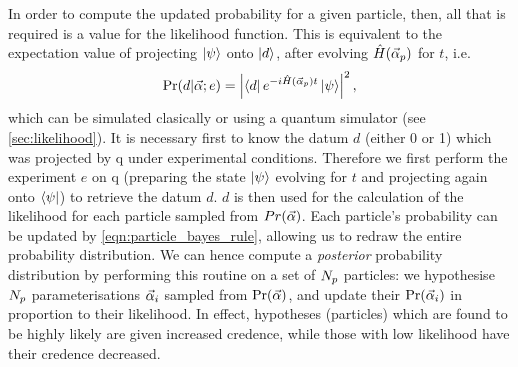 In order to compute the updated probability for a given particle, then, all that is required is a value for the \gls{likelihood} function.
This is equivalent to the expectation value of projecting $\ket{\psi}$ onto $\ket{d}$, after evolving $\hat{H}(\vec{\alpha}_p)$ for $t$, i.e. 
\begin{equation}
    \label{eqn:likelihood}
    \Pr(d | \vec{\alpha}; e) = \left| \bra{d} e^{-i \hat{H}(\vec{\alpha}_p)t} \ket{\psi} \right|^2,   
\end{equation}
    which can be simulated clasically or using a quantum simulator (see \cref{sec:likelihood}). 
It is necessary first to know the datum $d$ (either 0 or 1) which was projected by \gls{q} under experimental conditions. 
Therefore we first perform the experiment $e$ on \gls{q} 
    (preparing the state $\ket{\psi}$ evolving for $t$ and projecting again onto $\bra{\psi}$)
    to retrieve the datum $d$. 
$d$ is then used for the calculation of the \gls{likelihood} for each particle sampled from $Pr({\vec{\alpha}})$. 
Each particle's probability can be updated by \cref{eqn:particle_bayes_rule}, 
    allowing us to redraw the entire probability distribution.
We can hence compute a \emph{posterior} probability distribution
    by performing this routine on a set of $N_p$ particles:
    we hypothesise $N_p$ parameterisations $\vec{\alpha}_i$ sampled from $\Pr(\vec{\alpha})$, 
    and update their $\Pr(\vec{\alpha}_i)$ in proportion to their likelihood.
In effect, hypotheses (particles) which are found to be highly likely are given increased credence, 
    while those with low likelihood have their credence decreased. 

